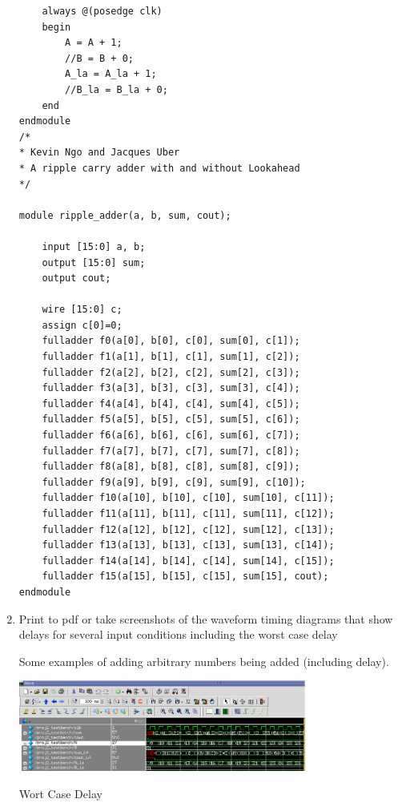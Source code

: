 \documentclass[12pt]{article}
\begin{document}
\begin{enumerate}
{\begin{verbatim}
    always @(posedge clk)
    begin
        A = A + 1;
        //B = B + 0;
        A_la = A_la + 1;
        //B_la = B_la + 0;
    end
endmodule
/*
* Kevin Ngo and Jacques Uber
* A ripple carry adder with and without Lookahead
*/

module ripple_adder(a, b, sum, cout);

    input [15:0] a, b;
    output [15:0] sum;
    output cout;

    wire [15:0] c;
    assign c[0]=0;
    fulladder f0(a[0], b[0], c[0], sum[0], c[1]);
    fulladder f1(a[1], b[1], c[1], sum[1], c[2]);
    fulladder f2(a[2], b[2], c[2], sum[2], c[3]);
    fulladder f3(a[3], b[3], c[3], sum[3], c[4]);
    fulladder f4(a[4], b[4], c[4], sum[4], c[5]);
    fulladder f5(a[5], b[5], c[5], sum[5], c[6]);
    fulladder f6(a[6], b[6], c[6], sum[6], c[7]);
    fulladder f7(a[7], b[7], c[7], sum[7], c[8]);
    fulladder f8(a[8], b[8], c[8], sum[8], c[9]);
    fulladder f9(a[9], b[9], c[9], sum[9], c[10]);
    fulladder f10(a[10], b[10], c[10], sum[10], c[11]);
    fulladder f11(a[11], b[11], c[11], sum[11], c[12]);
    fulladder f12(a[12], b[12], c[12], sum[12], c[13]);
    fulladder f13(a[13], b[13], c[13], sum[13], c[14]);
    fulladder f14(a[14], b[14], c[14], sum[14], c[15]);
    fulladder f15(a[15], b[15], c[15], sum[15], cout);
endmodule

    \end{verbatim}
    }

    \item
    Print to pdf or take screenshots of the waveform timing diagrams that show delays for several input conditions including the worst case delay

    \subitem
    Some examples of adding arbitrary numbers being added (including delay).

    \includegraphics[scale=0.50]{img/correct_math.png}

    \subitem
    Wort Case Delay


\end{enumerate}
\end{document}
